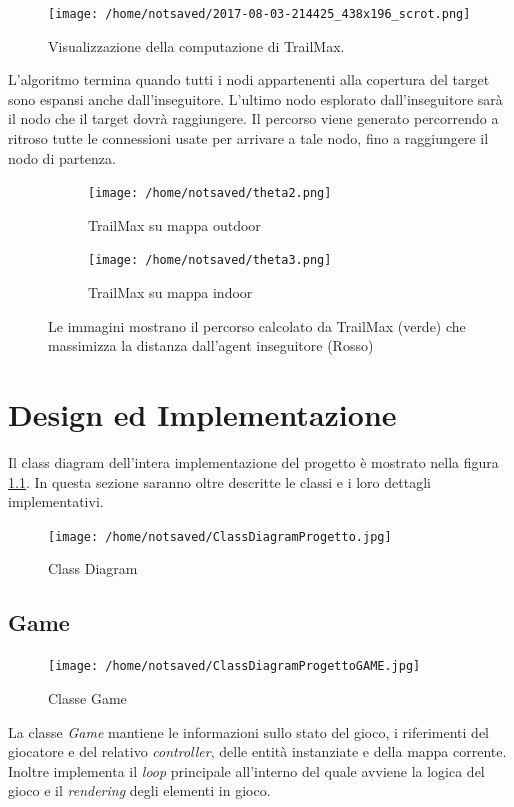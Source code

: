 \documentclass[11pt]{book}
\begin{document}
\begin{figure}[htp]
\centering
\texttt{[image: /home/notsaved/2017-08-03-214425\_438x196\_scrot.png]}
\caption{Visualizzazione della computazione di TrailMax.}
\label{trailmaxexp}
\end{figure}
\par{L'algoritmo termina quando tutti i nodi appartenenti alla copertura del target sono espansi anche dall'inseguitore. L'ultimo nodo esplorato dall'inseguitore sar\`a il nodo che il target dovr\`a raggiungere. Il percorso viene generato percorrendo a ritroso tutte le connessioni usate per arrivare a tale nodo, fino a raggiungere il nodo di partenza.}

\begin{figure}
\begin{subfigure}{.5\textwidth}
  \centering
  \texttt{[image: /home/notsaved/theta2.png]}
  \caption{TrailMax su mappa outdoor}
  \label{fig:sfig1}
\end{subfigure}%
\begin{subfigure}{.5\textwidth}
  \centering
  \texttt{[image: /home/notsaved/theta3.png]}
  \caption{TrailMax su mappa indoor}
  \label{fig:sfig2}
\end{subfigure}
\caption{Le immagini mostrano il percorso calcolato da TrailMax (verde) che massimizza la distanza dall'agent inseguitore (Rosso)}
\label{fig:fig}
\end{figure}

\chapter{Design ed Implementazione}
Il class diagram dell'intera implementazione del progetto \`e mostrato nella figura \ref{classdiagram}. In questa sezione saranno oltre descritte le classi e i loro dettagli implementativi.
\begin{figure}[htp]
\centering
\texttt{[image: /home/notsaved/ClassDiagramProgetto.jpg]}
\caption{Class Diagram}
\label{classdiagram}
\end{figure}

\section{Game}
\begin{figure}[H]
\centering
\texttt{[image: /home/notsaved/ClassDiagramProgettoGAME.jpg]}
\caption{Classe Game}
\label{clssgame}
\end{figure}
La classe \emph{Game} mantiene le informazioni sullo stato del gioco, i riferimenti del giocatore e del relativo \emph{controller}, delle entit\`a instanziate e della mappa corrente. Inoltre implementa il \emph{loop} principale all'interno del quale avviene la logica del gioco e il \emph{rendering} degli elementi in gioco.
\end{document}
